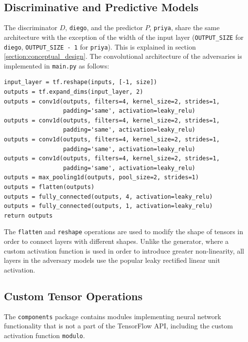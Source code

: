 \documentclass[12pt, titlepage]{report}
\theoremstyle{definition}
\begin{document}
\subsection{Discriminative and Predictive Models}
The discriminator $D$, \texttt{diego}, and the predictor $P$, \texttt{priya}, share the same architecture with the exception of the width of the input layer (\texttt{OUTPUT_SIZE} for \texttt{diego}, \texttt{OUTPUT_SIZE - 1} for \texttt{priya}). This is explained in section \ref{section:conceptual_design}. The convolutional architecture of the adversaries is implemented in \texttt{main.py} as follows:

\begin{verbatim}
input_layer = tf.reshape(inputs, [-1, size])
outputs = tf.expand_dims(input_layer, 2)
outputs = conv1d(outputs, filters=4, kernel_size=2, strides=1, 
                 padding='same', activation=leaky_relu)
outputs = conv1d(outputs, filters=4, kernel_size=2, strides=1, 
                 padding='same', activation=leaky_relu)
outputs = conv1d(outputs, filters=4, kernel_size=2, strides=1, 
                 padding='same', activation=leaky_relu)
outputs = conv1d(outputs, filters=4, kernel_size=2, strides=1, 
                 padding='same', activation=leaky_relu)
outputs = max_pooling1d(outputs, pool_size=2, strides=1)
outputs = flatten(outputs)
outputs = fully_connected(outputs, 4, activation=leaky_relu)
outputs = fully_connected(outputs, 1, activation=leaky_relu)
return outputs
\end{verbatim}

The \texttt{flatten} and \texttt{reshape} operations are used to modify the shape of tensors in order to connect layers with different shapes. Unlike the generator, where a custom activation function is used in order to introduce greater non-linearity, all layers in the adversary models use the popular leaky rectified linear unit activation.



\subsection{Custom Tensor Operations}\label{subsection:custom_ops}
The \texttt{components} package contains modules implementing neural network functionality that is not a part of the TensorFlow API, including the custom activation function \texttt{modulo}.
\end{document}
